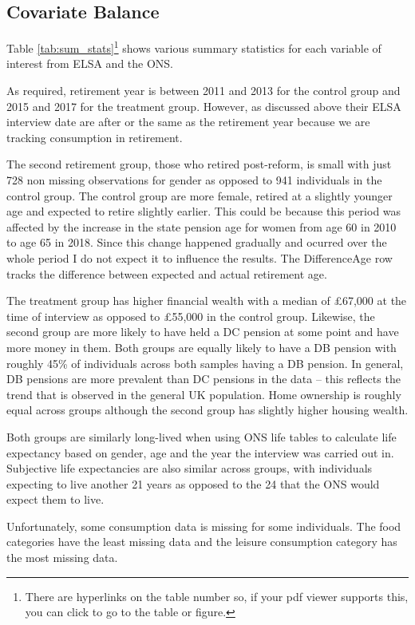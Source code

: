 \documentclass[12pt]{article}
\begin{document}
\subsection{Covariate Balance}

Table \ref{tab:sum_stats}\footnote{There are hyperlinks on the table number so,
    if your pdf viewer supports this, you can click to go to the table or
    figure.} shows various summary statistics for each variable of interest from
ELSA and the ONS.

As required, retirement year is between 2011 and 2013 for the control group and
2015 and 2017 for the treatment group. However, as discussed above their ELSA
interview date are after or the same as the retirement year because we are
tracking consumption in retirement.

The second retirement group, those who retired post-reform, is small with just
728 non missing observations for gender as opposed to 941 individuals in the
control group. The control group are more female, retired at a slightly younger
age and expected to retire slightly earlier. This could be because this period
was affected by the increase in the state pension age for women from age 60 in
2010 to age 65 in 2018. Since this change happened gradually and ocurred over
the whole period I do not expect it to influence the results. The DifferenceAge
row tracks the difference between expected and actual retirement age.

The treatment group has higher financial wealth with a median of £67,000 at the
time of interview as opposed to £55,000 in the control group. Likewise, the
second group are more likely to have held a DC pension at some point and have
more money in them. Both groups are equally likely to have a DB pension with
roughly 45\% of individuals across both samples having a DB pension. In general,
DB pensions are more prevalent than DC pensions in the data -- this reflects the
trend that is observed in the general UK population. Home ownership is roughly
equal across groups although the second group has slightly higher housing
wealth.

Both groups are similarly long-lived when using ONS life tables to calculate
life expectancy based on gender, age and the year the interview was carried out
in. Subjective life expectancies are also similar across groups, with
individuals expecting to live another 21 years as opposed to the 24 that the ONS
would expect them to live.

Unfortunately, some consumption data is missing for some individuals. The food
categories have the least missing data and the leisure consumption category has
the most missing data.
\end{document}

